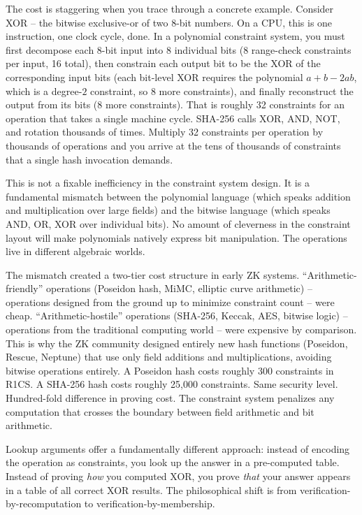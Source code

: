 \documentclass[
  11pt,
  openany]{report}
\begin{document}
The cost is staggering when you trace through a concrete example. Consider XOR
-- the bitwise exclusive-or of two 8-bit numbers. On a CPU, this is one
instruction, one clock cycle, done. In a polynomial constraint system, you must
first decompose each 8-bit input into 8 individual bits (8 range-check
constraints per input, 16 total), then constrain each output bit to be the XOR
of the corresponding input bits (each bit-level XOR requires the polynomial
\(a + b - 2ab\), which is a degree-\(2\) constraint, so 8 more constraints), and
finally reconstruct the output from its bits (8 more constraints). That is
roughly 32 constraints for an operation that takes a single machine cycle.
SHA-256 calls XOR, AND, NOT, and rotation thousands of times. Multiply 32
constraints per operation by thousands of operations and you arrive at the tens
of thousands of constraints that a single hash invocation demands.

This is not a fixable inefficiency in the constraint system design. It is a
fundamental mismatch between the polynomial language (which speaks addition and
multiplication over large fields) and the bitwise language (which speaks AND,
OR, XOR over individual bits). No amount of cleverness in the constraint layout
will make polynomials natively express bit manipulation. The operations live in
different algebraic worlds.

The mismatch created a two-tier cost structure in early ZK systems.
``Arithmetic-friendly'' operations (Poseidon hash, MiMC, elliptic curve
arithmetic) -- operations designed from the ground up to minimize constraint
count -- were cheap. ``Arithmetic-hostile'' operations (SHA-256, Keccak, AES,
bitwise logic) -- operations from the traditional computing world -- were
expensive by comparison. This is why the ZK community designed entirely new hash
functions (Poseidon, Rescue, Neptune) that use only field additions and
multiplications, avoiding bitwise operations entirely. A Poseidon hash costs
roughly 300 constraints in R1CS. A SHA-256 hash costs roughly 25,000
constraints. Same security level. Hundred-fold difference in proving cost. The
constraint system penalizes any computation that crosses the boundary between
field arithmetic and bit arithmetic.

Lookup arguments offer a fundamentally different approach: instead of encoding
the operation as constraints, you look up the answer in a pre-computed table.
Instead of proving \emph{how} you computed XOR, you prove \emph{that} your
answer appears in a table of all correct XOR results. The philosophical shift is
from verification-by-recomputation to verification-by-membership.
\end{document}
